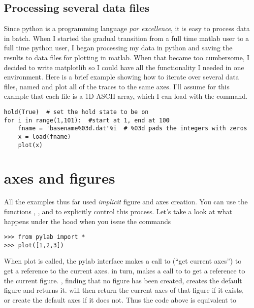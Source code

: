 \documentclass[twoside]{book}
\begin{document}
\subsection{Processing several data files}
\label{sec:multiple_files}

Since python is a programming language \textit{par excellence}, it is
easy to process data in batch.  When I started the gradual transition
from a full time matlab user to a full time python user, I began
processing my data in python and saving the results to data files for
plotting in matlab.  When that became too cumbersome, I decided to
write matplotlib so I could have all the functionality I needed in one
environment.  Here is a brief example showing how to iterate over
several data files, named  and plot all of the traces to
the same axes.  I'll assume for this example that each file is a 1D
ASCII array, which I can load with the  command.

\begin{lstlisting}
hold(True)  # set the hold state to be on
for i in range(1,101):  #start at 1, end at 100
    fname = 'basename%03d.dat'%i  # %03d pads the integers with zeros
    x = load(fname)
    plot(x)
\end{lstlisting}


\section{axes and figures}
\label{sec:axes_and_figures}
All the examples thus far used \textit{implicit} figure and axes
creation.  You can use the functions , ,
and  to explicitly control this process.  Let's take a look
at what happens under the hood when you issue the commands

\begin{lstlisting}
>>> from pylab import *
>>> plot([1,2,3])
\end{lstlisting}

When plot is called, the pylab interface makes a call to 
(``get current axes'') to get a reference to the current axes.
 in turn, makes a call to  to get a reference to
the current figure.  , finding that no figure has been
created, creates the default figure  and returns it.
 will then return the current axes of that figure if it
exists, or create the default axes  if it does
not.  Thus the code above is equivalent to 
\end{document}
